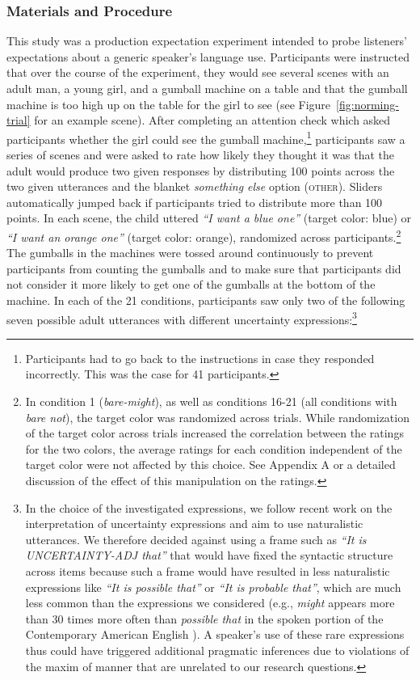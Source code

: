 \documentclass[man, floatsintext]{apa6}
\begin{document}
\subsubsection{Materials and Procedure}
This study was a production expectation experiment intended to probe listeners' expectations about a generic speaker's language use.
Participants were instructed that over the course of the experiment, they would see several scenes with an adult man, 
a young girl, and a gumball machine on a table and 
that the gumball machine is too high up on the table for the girl to see (see Figure~\ref{fig:norming-trial} for an example scene). 
After completing an attention check which asked participants whether 
the girl could see the gumball machine,\footnote{Participants had to go back to the instructions in case they responded incorrectly. This was the case for 41 participants.} 
participants saw a series of scenes  and were asked to rate how likely they thought it was that the 
adult would produce two given responses by distributing 100 points across the two given utterances and the 
blanket \textit{something else} option (\textsc{other}). Sliders automatically jumped back if participants tried to distribute more than 100 points. 
In each scene, the child uttered \textit{``I want a blue one''} (target color: blue) or  \textit{``I want an orange one''} (target color: orange), randomized across participants.\footnote{In condition 1 (\textit{bare-might}), as well as conditions 16-21 (all conditions with \textit{bare not}), the target color was randomized across trials. While randomization of the target color across trials increased the correlation between the ratings for the two colors,  the average ratings for each condition independent of the target color were not affected by this choice. See Appendix A or a detailed discussion of the effect of this manipulation on the ratings.} The gumballs in the machines were tossed around continuously to prevent participants from counting the gumballs
and to make sure that participants did not consider it more likely to get one of the gumballs at the bottom of the machine.
 In each of the 21 conditions, participants saw only  two of the following seven possible adult utterances with different uncertainty expressions:\footnote{In the choice of the investigated expressions, we follow recent work on the interpretation of uncertainty expressions \parencite{Pogue2018} and aim to use naturalistic utterances. We therefore decided against using a frame such as \emph{``It is UNCERTAINTY-ADJ that''} that would have fixed the syntactic structure across items because such a frame would have resulted in less naturalistic expressions like  \emph{``It is possible that''} or  \emph{``It is probable that''}, which are much less common than the expressions we considered (e.g., \textit{might} appears more than 30 times more often than \textit{possible that} in the spoken portion of the Contemporary American English \parencite{Davies2009}). A speaker's use of these rare expressions thus could have triggered additional pragmatic inferences due to violations of the maxim of manner \parencite{Grice1975} that are unrelated to our research questions.}
\end{document}
